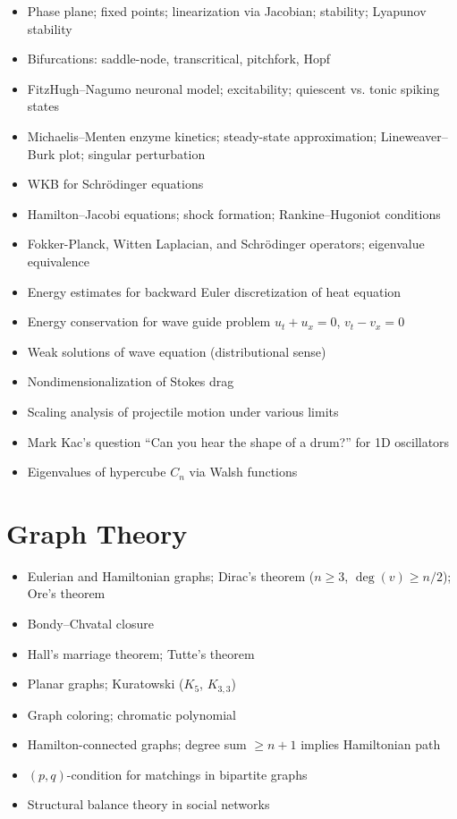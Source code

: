 \documentclass{amsart}
\begin{document}
\begin{itemize}
  \item Phase plane; fixed points; linearization via Jacobian; stability; Lyapunov stability
  \item Bifurcations: saddle-node, transcritical, pitchfork, Hopf
  \item FitzHugh--Nagumo neuronal model; excitability; quiescent vs. tonic spiking states
  \item Michaelis--Menten enzyme kinetics; steady-state approximation; Lineweaver--Burk plot; singular perturbation
  \item WKB for Schr\"odinger equations
  \item Hamilton--Jacobi equations; shock formation; Rankine--Hugoniot conditions
  \item Fokker-Planck, Witten Laplacian, and Schr\"odinger operators; eigenvalue equivalence
  \item Energy estimates for backward Euler discretization of heat equation
  \item Energy conservation for wave guide problem $u_t + u_x = 0$, $v_t - v_x = 0$
  \item Weak solutions of wave equation (distributional sense)
  \item Nondimensionalization of Stokes drag
  \item Scaling analysis of projectile motion under various limits
  \item Mark Kac's question ``Can you hear the shape of a drum?'' for 1D oscillators
  \item Eigenvalues of hypercube $C_n$ via Walsh functions
\end{itemize}

\section{Graph Theory}

\begin{itemize}
  \item Eulerian and Hamiltonian graphs; Dirac's theorem ($n\geq3$, $\deg(v)\geq n/2$); Ore's theorem
  \item Bondy--Chvatal closure
  \item Hall's marriage theorem; Tutte's theorem
  \item Planar graphs; Kuratowski ($K_5$, $K_{3,3}$)
  \item Graph coloring; chromatic polynomial
  \item Hamilton-connected graphs; degree sum $\geq n+1$ implies Hamiltonian path
  \item $(p,q)$-condition for matchings in bipartite graphs
  \item Structural balance theory in social networks
\end{itemize}
\end{document}
